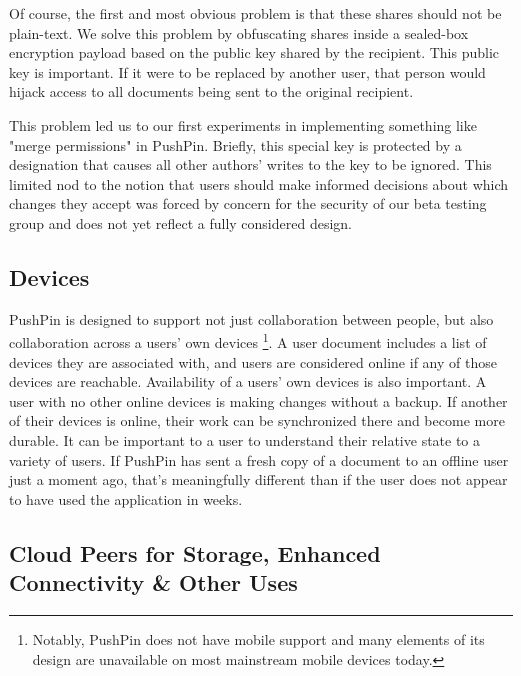 \documentclass[sigplan,10pt]{acmart}
\begin{document}
Of course, the first and most obvious problem is that these shares should not be plain-text. We solve this problem by obfuscating shares inside a sealed-box encryption payload based on the public key shared by the recipient. This public key is important. If it were to be replaced by another user, that person would hijack access to all documents being sent to the original recipient.

This problem led us to our first experiments in implementing something like "merge permissions" in PushPin. Briefly, this special key is protected by a designation that causes all other authors' writes to the key to be ignored. This limited nod to the notion that users should make informed decisions about which changes they accept was forced by concern for the security of our beta testing group and does not yet reflect a fully considered design.

\subsection{Devices}

PushPin is designed to support not just collaboration between people, but also collaboration across a users' own devices \footnote{Notably, PushPin does not have mobile support and many elements of its design are unavailable on most mainstream mobile devices today.}. A user document includes a list of devices they are associated with, and users are considered online if any of those devices are reachable. Availability of a users' own devices is also important. A user with no other online devices is making changes without a backup. If another of their devices is online, their work can be synchronized there and become more durable. It can be important to a user to understand their relative state to a variety of users. If PushPin has sent a fresh copy of a document to an offline user just a moment ago, that's meaningfully different than if the user does not appear to have used the application in weeks. 

\subsection{Cloud Peers for Storage, Enhanced Connectivity & Other Uses}
\end{document}

